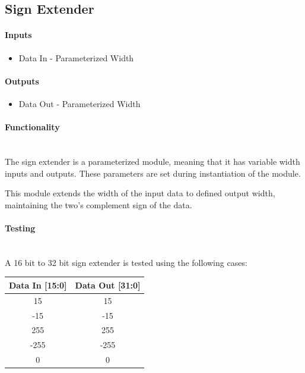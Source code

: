 \documentclass{article}
\begin{document}
    \subsection{Sign Extender}

    \paragraph{Inputs}
    \begin{itemize}
        \item Data In - Parameterized Width
    \end{itemize}

    \paragraph{Outputs}
    \begin{itemize}
        \item Data Out - Parameterized Width
    \end{itemize}

    \paragraph{Functionality}
    \hfill\\

    The sign extender is a parameterized module, meaning that it has
    variable width inputs and outputs. These parameters are set during
    instantiation of the module.

    This module extends the width of the input data to defined output
    width, maintaining the two's complement sign of the data.

    \paragraph{Testing}
    \hfill\\

    A 16 bit to 32 bit sign extender is tested using the following cases:

    \begin{center}
        \begin{tabular}{|c||c|}
            \hline
            Data In [15:0] & Data Out [31:0]
            \\\hline\hline
            15 & 15
            \\\hline
            -15 & -15
            \\\hline
            255 & 255
            \\\hline
            -255 & -255
            \\\hline
            0 & 0
            \\\hline
        \end{tabular}
    \end{center}
\end{document}
